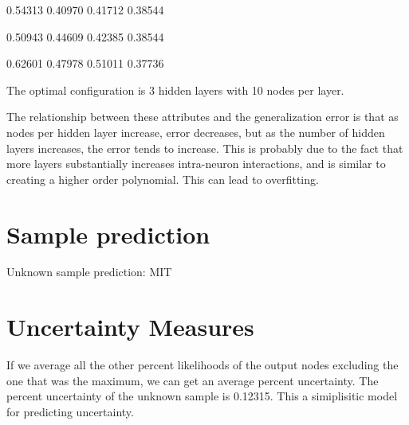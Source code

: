\documentclass[10pt]{article}
\begin{document}
\begin{flushleft}
   0.54313   0.40970   0.41712   0.38544

   0.50943   0.44609   0.42385   0.38544

   0.62601   0.47978   0.51011   0.37736

The optimal configuration is 3 hidden layers with 10 nodes per layer.

The relationship between these attributes and the generalization error is that as nodes per hidden layer increase, error decreases, but as the number of hidden layers increases, the error tends to increase. This is probably due to the fact that more layers substantially increases intra-neuron interactions, and is similar to creating a higher order polynomial. This can lead to overfitting. 

\section{Sample prediction}

Unknown sample prediction: MIT

\section{Uncertainty Measures}

If we average all the other percent likelihoods of the output nodes excluding the one that was the maximum, we can get an average percent uncertainty. The percent uncertainty of the unknown sample is 0.12315. This a simiplisitic model for predicting uncertainty.

\end{flushleft}
\end{document}
